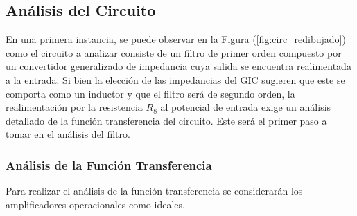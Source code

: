 \documentclass[a4paper]{article}
\begin{document}
\subsection{Análisis del Circuito}

En una primera instancia, se puede observar en la Figura (\ref{fig:circ_redibujado}) como el circuito a analizar consiste de un filtro de primer orden compuesto por un convertidor generalizado de impedancia cuya salida se encuentra realimentada a la entrada. Si bien la elección de las impedancias del GIC sugieren que este se comporta como un inductor y que el filtro será de segundo orden, la realimentación por la resistencia $R_8$ al potencial de entrada exige un análisis detallado de la función transferencia del circuito. Este será el primer paso a tomar en el análisis del filtro.

\subsubsection{Análisis de la Función Transferencia}
Para realizar el análisis de la función transferencia se considerarán los amplificadores operacionales como ideales.
\end{document}
